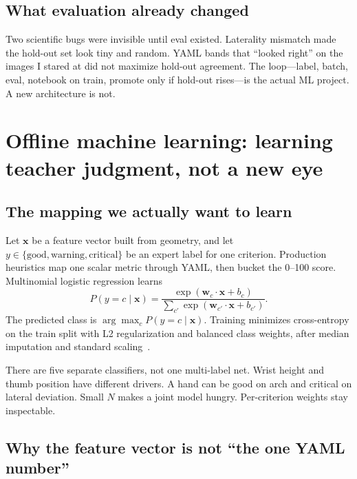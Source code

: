 \documentclass[11pt,a4paper]{article}
\begin{document}
\subsection{What evaluation already changed}

Two scientific bugs were invisible until eval existed.
Laterality mismatch made the hold-out set look tiny and random.
YAML bands that \enquote{looked right} on the images I stared at did not maximize hold-out agreement.
The loop---label, batch, eval, notebook on train, promote only if hold-out rises---is the actual ML project.
A new architecture is not.

\section{Offline machine learning: learning teacher judgment, not a new eye}
\label{sec:ml}

\subsection{The mapping we actually want to learn}

Let \(\mathbf{x}\) be a feature vector built from geometry, and let \(y \in \{\text{good},\text{warning},\text{critical}\}\) be an expert label for one criterion.
Production heuristics map one scalar metric through YAML, then bucket the 0--100 score.
Multinomial logistic regression learns
\begin{equation}
  P(y=c\mid\mathbf{x}) = \frac{\exp(\mathbf{w}_c\cdot\mathbf{x}+b_c)}{\sum_{c'}\exp(\mathbf{w}_{c'}\cdot\mathbf{x}+b_{c'})}.
\end{equation}
The predicted class is \(\arg\max_c P(y=c\mid\mathbf{x})\).
Training minimizes cross-entropy on the train split with L2 regularization and balanced class weights, after median imputation and standard scaling~\cite{mllogistic}.

There are five separate classifiers, not one multi-label net.
Wrist height and thumb position have different drivers.
A hand can be good on arch and critical on lateral deviation.
Small \(N\) makes a joint model hungry.
Per-criterion weights stay inspectable.

\subsection{Why the feature vector is not \enquote{the one YAML number}}
\end{document}
